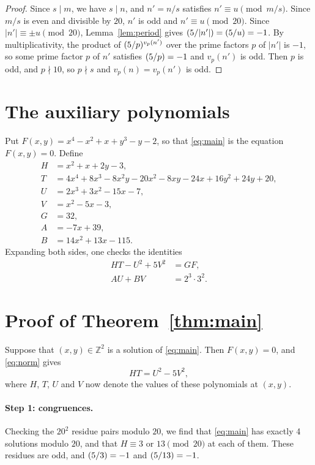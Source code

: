 \documentclass[11pt]{article}
\newcommand{\Z}{\mathbb{Z}}
\newcommand{\leg}[2]{\mathchoice{\biggl(\dfrac{#1}{#2}\biggr)}{(#1/#2)}{(#1/#2)}{(#1/#2)}}
\begin{document}
\begin{proof}
Since $s\mid m$, we have $s\mid n$, and $n'=n/s$ satisfies $n'\equiv u\pmod{m/s}$. Since $m/s$ is even and divisible by $20$, $n'$ is odd and $n'\equiv u\pmod{20}$. Since $|n'|\equiv\pm u\pmod{20}$, Lemma~\ref{lem:period} gives $\leg{5}{|n'|}=\leg{5}{u}=-1$. By multiplicativity, the product of $\leg{5}{p}^{v_p(n')}$ over the prime factors $p$ of $|n'|$ is $-1$, so some prime factor $p$ of $n'$ satisfies $\leg{5}{p}=-1$ and $v_p(n')$ is odd. Then $p$ is odd, and $p\nmid10$, so $p\nmid s$ and $v_p(n)=v_p(n')$ is odd.
\end{proof}

\section{The auxiliary polynomials}

Put $F(x,y)=x^{4}-x^{2}+x+y^{3}-y-2$, so that \eqref{eq:main} is the equation $F(x,y)=0$. Define
\begin{align*}
H&=x^{2}+x+2y-3,\\
T&=4x^{4}+8x^{3}-8x^{2}y-20x^{2}-8xy-24x+16y^{2}+24y+20,\\
U&=2x^{3}+3x^{2}-15x-7,\\
V&=x^{2}-5x-3,\\
G&=32,\\
A&=-7x+39,\\
B&=14x^{2}+13x-115.
\end{align*}
Expanding both sides, one checks the identities
\begin{align}
HT-U^2+5V^2&=GF,\label{eq:norm}\\
AU+BV&=2^{3}\cdot 3^{2}.\label{eq:bezout}
\end{align}

\section{Proof of Theorem~\ref{thm:main}}

Suppose that $(x,y)\in\Z^2$ is a solution of \eqref{eq:main}. Then $F(x,y)=0$, and \eqref{eq:norm} gives
\begin{equation}\label{eq:HT}
HT=U^2-5V^2,
\end{equation}
where $H$, $T$, $U$ and $V$ now denote the values of these polynomials at $(x,y)$.

\paragraph{Step 1: congruences.} Checking the $20^2$ residue pairs modulo $20$, we find that \eqref{eq:main} has exactly 4 solutions modulo $20$, and that $H\equiv3\text{ or }13\pmod{20}$ at each of them. These residues are odd, and $\leg{5}{3}=-1$ and $\leg{5}{13}=-1$.
\end{document}
